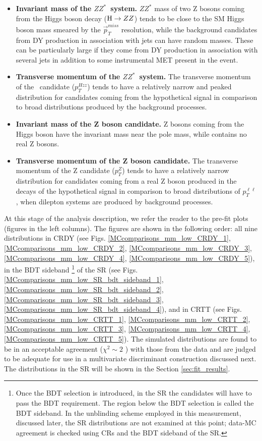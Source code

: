 \begin{itemize}
\item{\bfseries Invariant mass of the $ZZ^*$~system.} 
$ZZ^*$ mass of two Z bosons coming from the Higgs boson decay ($\mathrm{H}\rightarrow ZZ$) tends to be close to the SM Higgs boson mass smeared by the $\vec{p}^{miss}_T$ resolution, while the background candidates from DY production in association with jets can have random masses. These can be particularly large if they come from DY production in association with several jets in addition to some instrumental MET present in the event.

\item{\bfseries Transverse momentum of the $ZZ^*$~system.} 
The transverse momentum of the \HZZ~candidate ($p_T^{Hzz}$) tends to have a relatively narrow and peaked distribution for candidates coming from the hypothetical signal in comparison to broad distributions produced by the background processes. 

\item{\bfseries Invariant mass of the Z boson candidate.} 
Z bosons coming from the Higgs boson have the invariant mass near the pole mass, while \ttbar contains no real Z bosons.

\item{\bfseries Transverse momentum of the Z boson candidate.} 
The transverse momentum of the Z candidate ($p_T^Z$) tends to have a relatively narrow distribution for candidates coming from a real Z boson produced in the decays of the hypothetical signal in comparison to broad distributions of $p_T^{\ell\ell}$, when dilepton systems are produced by background processes. 

\end{itemize}

At this stage of the analysis description, we refer the reader to the pre-fit plots (figures in the left columns). The figures are shown in the following order: all nine distributions in CRDY (see Figs. \ref{MCcomparisons_mm_low_CRDY_1}, \ref{MCcomparisons_mm_low_CRDY_2}, \ref{MCcomparisons_mm_low_CRDY_3}, \ref{MCcomparisons_mm_low_CRDY_4}, \ref{MCcomparisons_mm_low_CRDY_5}), in the BDT sideband \footnote{Once the BDT selection is introduced, in the SR the candidates will have to pass the BDT requirement. The region below the BDT selection is called the BDT sideband. In the unblinding scheme employed in this measurement, discussed later, the SR distributions are not examined at this point; data-MC agreement is checked using CRs and the BDT sideband of the SR.} of the SR (see Figs. \ref{MCcomparisons_mm_low_SR_bdt_sideband_1}, \ref{MCcomparisons_mm_low_SR_bdt_sideband_2}, \ref{MCcomparisons_mm_low_SR_bdt_sideband_3}, \ref{MCcomparisons_mm_low_SR_bdt_sideband_4}), and in CRTT (see Figs. \ref{MCcomparisons_mm_low_CRTT_1}, \ref{MCcomparisons_mm_low_CRTT_2}, \ref{MCcomparisons_mm_low_CRTT_3}, \ref{MCcomparisons_mm_low_CRTT_4}, \ref{MCcomparisons_mm_low_CRTT_5}). The simulated distributions are found to be in an acceptable agreement ($\chi^2 \sim 2$ ) with those from the data and are judged to be adequate for use in a multivariate discriminant construction discussed next. The distributions in the SR will be shown in the Section \ref{sec:fit_results}.

